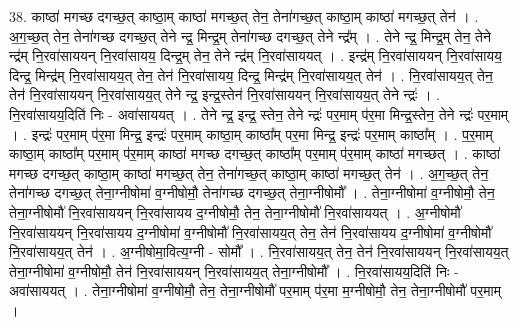\documentclass[17pt]{extarticle}
\begin{document}
38. काष्ठा॑ मगच्छ दगच्छ॒त् काष्ठा॒म् काष्ठा॑ मगच्छ॒त् तेन॒ तेना॑गच्छ॒त् काष्ठा॒म् काष्ठा॑ मगच्छ॒त् तेन॑ । . अ॒ग॒च्छ॒त् तेन॒ तेना॑गच्छ दगच्छ॒त् तेने न्द्र॒ मिन्द्र॒म् तेना॑गच्छ दगच्छ॒त् तेने न्द्र᳚म् । . तेने न्द्र॒ मिन्द्र॒म् तेन॒ तेने न्द्र॑म् नि॒रवा॑साययन् नि॒रवा॑सायय॒ दिन्द्र॒म् तेन॒ तेने न्द्र॑म् नि॒रवा॑साययत् । . इन्द्र॑म् नि॒रवा॑साययन् नि॒रवा॑सायय॒ दिन्द्र॒ मिन्द्र॑म् नि॒रवा॑सायय॒त् तेन॒ तेन॑ नि॒रवा॑सायय॒ दिन्द्र॒ मिन्द्र॑म् नि॒रवा॑सायय॒त् तेन॑ । . नि॒रवा॑सायय॒त् तेन॒ तेन॑ नि॒रवा॑साययन् नि॒रवा॑सायय॒त् तेने न्द्र॒ इन्द्र॒स्तेन॑ नि॒रवा॑साययन् नि॒रवा॑सायय॒त् तेने न्द्रः॑ । . नि॒रवा॑सायय॒दिति॑ निः - अवा॑साययत् । . तेने न्द्र॒ इन्द्र॒ स्तेन॒ तेने न्द्रः॑ पर॒माम् प॑र॒मा मिन्द्र॒स्तेन॒ तेने न्द्रः॑ पर॒माम् । . इन्द्रः॑ पर॒माम् प॑र॒मा मिन्द्र॒ इन्द्रः॑ पर॒माम् काष्ठा॒म् काष्ठा᳚म् पर॒मा मिन्द्र॒ इन्द्रः॑ पर॒माम् काष्ठा᳚म् । . प॒र॒माम् काष्ठा॒म् काष्ठा᳚म् पर॒माम् प॑र॒माम् काष्ठा॑ मगच्छ दगच्छ॒त् काष्ठा᳚म् पर॒माम् प॑र॒माम् काष्ठा॑ मगच्छत् । . काष्ठा॑ मगच्छ दगच्छ॒त् काष्ठा॒म् काष्ठा॑ मगच्छ॒त् तेन॒ तेना॑गच्छ॒त् काष्ठा॒म् काष्ठा॑ मगच्छ॒त् तेन॑ । . अ॒ग॒च्छ॒त् तेन॒ तेना॑गच्छ दगच्छ॒त् तेना॒ग्नीषोमा॑ व॒ग्नीषोमौ॒ तेना॑गच्छ दगच्छ॒त् तेना॒ग्नीषोमौ᳚ । . तेना॒ग्नीषोमा॑ व॒ग्नीषोमौ॒ तेन॒ तेना॒ग्नीषोमौ॑ नि॒रवा॑साययन् नि॒रवा॑सायय द॒ग्नीषोमौ॒ तेन॒ तेना॒ग्नीषोमौ॑ नि॒रवा॑साययत् । . अ॒ग्नीषोमौ॑ नि॒रवा॑साययन् नि॒रवा॑सायय द॒ग्नीषोमा॑ व॒ग्नीषोमौ॑ नि॒रवा॑सायय॒त् तेन॒ तेन॑ नि॒रवा॑सायय द॒ग्नीषोमा॑ व॒ग्नीषोमौ॑ नि॒रवा॑सायय॒त् तेन॑ । . अ॒ग्नीषोमा॒वित्य॒ग्नी - सोमौ᳚ । . नि॒रवा॑सायय॒त् तेन॒ तेन॑ नि॒रवा॑साययन् नि॒रवा॑सायय॒त् तेना॒ग्नीषोमा॑ व॒ग्नीषोमौ॒ तेन॑ नि॒रवा॑साययन् नि॒रवा॑सायय॒त् तेना॒ग्नीषोमौ᳚ । . नि॒रवा॑सायय॒दिति॑ निः - अवा॑साययत् । . तेना॒ग्नीषोमा॑ व॒ग्नीषोमौ॒ तेन॒ तेना॒ग्नीषोमौ॑ पर॒माम् प॑र॒मा म॒ग्नीषोमौ॒ तेन॒ तेना॒ग्नीषोमौ॑ पर॒माम् । \newline
\end{document}
